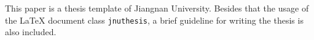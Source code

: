 \documentclass[pdftex, twoside, bachelor]{JNUthesis}
\begin{document}

\author{作者}

\maketitle



\frontmatter
\begin{spacing}{1.25}
\begin{abstract}

本文是江南大学学位论文的~\LaTeX{}~模板。目前不支持研究生学位论文格式。

除了介绍~\LaTeX{}~文档类~\texttt{jnuthesis}~的用法外，本文还是一
个简要的学位论文写作指南。


\end{abstract}
\pagestyle{abstract}

\begin{englishabstract}

This paper is a thesis template of Jiangnan University. Besides that
the usage of the \LaTeX{} document class \texttt{jnuthesis}, a brief
guideline for writing the thesis is also included.


\end{englishabstract}
\pagestyle{englishabstract}

\tableofcontents



\mainmatter

\makeatletter
  \let\ps@plain\ps@main
\makeatother
\pagestyle{main}


\end{spacing}
\end{document}
